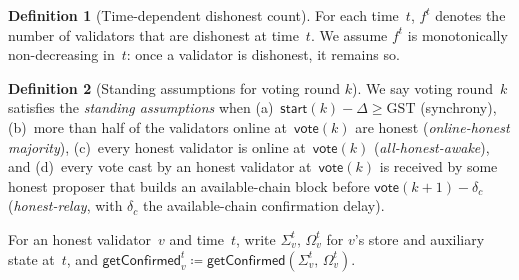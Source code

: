 \ifx\litemode\undefined\documentclass{article}\fi
\newcommand{\start}{\ensuremath{\mathsf{start}}}
\newcommand{\vote}{\ensuremath{\mathsf{vote}}}
\newcommand{\freeze}{\ensuremath{\mathsf{freeze}}}
\newcommand{\GST}{\ensuremath{\mathrm{GST}}\xspace}
\newcommand{\getConfirmed}{\textsf{getConfirmed}\xspace}
\theoremstyle{plain}
\theoremstyle{definition}
\newtheorem{definition}{Definition}
\theoremstyle{remark}
\begin{document}
\begin{figure}[H]
\begin{center}
\end{center}
\end{figure}

\begin{definition}[Time-dependent dishonest count]\label{rev:def:f-t}
For each time~$t$, $f^t$ denotes the number of validators that are dishonest at time~$t$. We assume $f^t$ is monotonically non-decreasing in~$t$: once a validator is dishonest, it remains so.
\end{definition}

\begin{definition}[Standing assumptions for voting round $k$]\label{def:standing}
We say voting round~$k$ satisfies the \emph{standing assumptions} when (a)~$\start(k) - \Delta \geq \GST$ (synchrony), (b)~more than half of the validators online at~$\vote(k)$ are honest (\emph{online-honest majority}), (c)~every honest validator is online at~$\vote(k)$ (\emph{all-honest-awake}), and (d)~every vote cast by an honest validator at~$\vote(k)$ is received by some honest proposer that builds an available-chain block before $\vote(k+1) - \delta_c$ (\emph{honest-relay}, with $\delta_c$ the available-chain confirmation delay).
\end{definition}

For an honest validator~$v$ and time~$t$, write $\Sigma_v^t,\, \Omega_v^t$ for $v$'s store and auxiliary state at~$t$, and $\getConfirmed_v^t \coloneqq \getConfirmed(\Sigma_v^t,\, \Omega_v^t)$.
\end{document}
